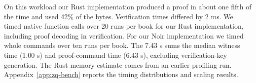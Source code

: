 On this workload our Rust implementation produced a proof in about one fifth of the time and used 42\% of the bytes. Verification times differed by 2 ms. We timed native function calls over 20 runs per book for our Rust implementation, including proof decoding in verification. For our Noir implementation we timed whole commands over ten runs per book. The 7.43 s sums the median witness time (1.00 s) and proof-command time (6.43 s), excluding verification-key generation. The Rust memory estimate comes from an earlier profiling run. Appendix~\ref{app:zq-bench} reports the timing distributions and scaling results.
